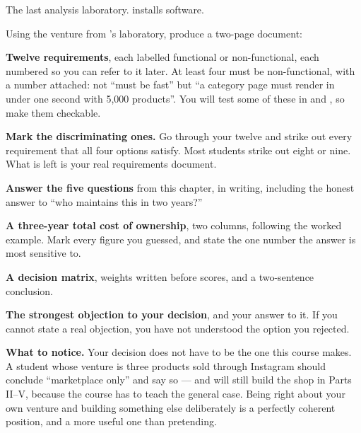 \begin{lab}
The last analysis laboratory.  installs software.

\smallskip
Using the venture from 's laboratory, produce a two-page
document:

\begin{tightnum}
  \item \textbf{Twelve requirements}, each labelled functional or
        non-functional, each numbered so you can refer to it later. At least
        four must be non-functional, with a number attached: not ``must be
        fast'' but ``a category page must render in under one second with
        5{,}000 products''. You will test some of these in
         and , so make them checkable.
  \item \textbf{Mark the discriminating ones.} Go through your twelve and strike
        out every requirement that all four options satisfy. Most students
        strike out eight or nine. What is left is your real requirements
        document.
  \item \textbf{Answer the five questions} from this chapter, in writing,
        including the honest answer to ``who maintains this in two years?''
  \item \textbf{A three-year total cost of ownership}, two columns, following
        the worked example. Mark every figure you guessed, and state the one
        number the answer is most sensitive to.
  \item \textbf{A decision matrix}, weights written before scores, and a
        two-sentence conclusion.
  \item \textbf{The strongest objection to your decision}, and your answer to
        it. If you cannot state a real objection, you have not understood the
        option you rejected.
\end{tightnum}

\smallskip
\textbf{What to notice.} Your decision does not have to be the one this course
makes. A student whose venture is three products sold through Instagram should
conclude ``marketplace only'' and say so --- and will still build the shop in
Parts II--V, because the course has to teach the general case. Being right
about your own venture and building something else deliberately is a perfectly
coherent position, and a more useful one than pretending.
\end{lab}

